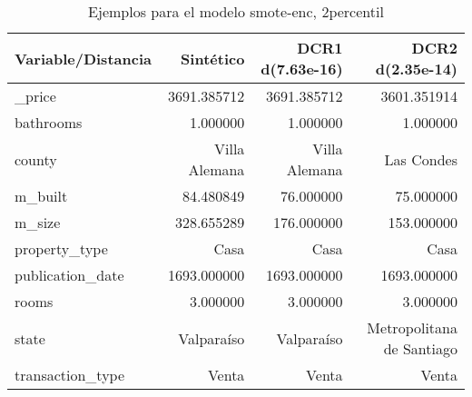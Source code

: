 \begin{table}[H]
\centering
\fontsize{10}{14}\selectfont
\caption{Ejemplos para el modelo smote-enc, 2percentil}
\label{table-example-economicos-b-2-smote-enc-2p}
\begin{tabular}{|l|r|r|r|}
\hline
\rowcolor[gray]{0.8}
Variable/Distancia & Sintético & DCR1 d(7.63e-16) & DCR2 d(2.35e-14) \\
\hline \_price & \cellcolor[rgb]{0.9, 0.54, 0.52} 3691.385712 & \cellcolor[rgb]{0.9, 0.54, 0.52} 3691.385712 & 3601.351914 \\
\hline bathrooms & \cellcolor[rgb]{0.9, 0.54, 0.52} 1.000000 & \cellcolor[rgb]{0.9, 0.54, 0.52} 1.000000 & \cellcolor[rgb]{0.9, 0.54, 0.52} 1.000000 \\
\hline county & \cellcolor[rgb]{0.9, 0.54, 0.52} Villa Alemana & \cellcolor[rgb]{0.9, 0.54, 0.52} Villa Alemana & Las Condes \\
\hline m\_built & \cellcolor[rgb]{0.9, 0.54, 0.52} 84.480849 & 76.000000 & 75.000000 \\
\hline m\_size & \cellcolor[rgb]{0.9, 0.54, 0.52} 328.655289 & 176.000000 & 153.000000 \\
\hline property\_type & \cellcolor[rgb]{0.9, 0.54, 0.52} Casa & \cellcolor[rgb]{0.9, 0.54, 0.52} Casa & \cellcolor[rgb]{0.9, 0.54, 0.52} Casa \\
\hline publication\_date & \cellcolor[rgb]{0.9, 0.54, 0.52} 1693.000000 & \cellcolor[rgb]{0.9, 0.54, 0.52} 1693.000000 & \cellcolor[rgb]{0.9, 0.54, 0.52} 1693.000000 \\
\hline rooms & \cellcolor[rgb]{0.9, 0.54, 0.52} 3.000000 & \cellcolor[rgb]{0.9, 0.54, 0.52} 3.000000 & \cellcolor[rgb]{0.9, 0.54, 0.52} 3.000000 \\
\hline state & \cellcolor[rgb]{0.9, 0.54, 0.52} Valparaíso & \cellcolor[rgb]{0.9, 0.54, 0.52} Valparaíso & Metropolitana de Santiago \\
\hline transaction\_type & \cellcolor[rgb]{0.9, 0.54, 0.52} Venta & \cellcolor[rgb]{0.9, 0.54, 0.52} Venta & \cellcolor[rgb]{0.9, 0.54, 0.52} Venta \\
\hline
\end{tabular}
\end{table}
